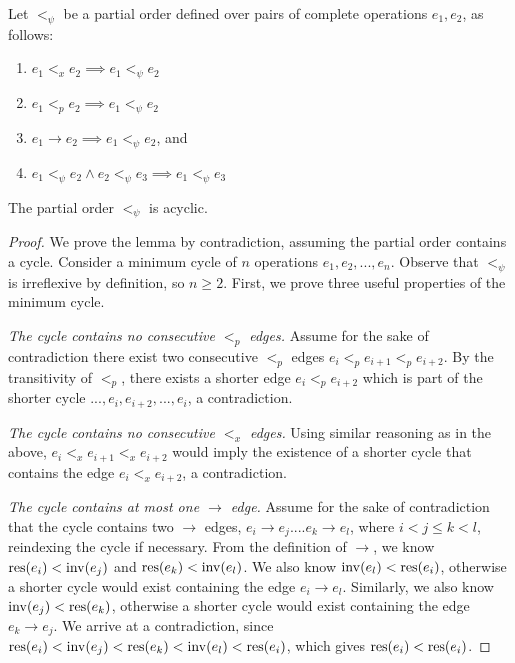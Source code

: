 Let $<_\psi$ be a partial order defined over pairs of complete operations $e_1, e_2$, as follows:
\begin{enumerate}
    \item $e_1 <_x e_2 \implies e_1 <_\psi e_2$
    \item $e_1 <_p e_2 \implies e_1 <_\psi e_2$
    \item $e_1 \rightarrow e_2 \implies e_1 <_\psi e_2$, and
    \item $e_1 <_\psi e_2 \land e_2 <_\psi e_3 \implies e_1 <_\psi e_3$
\end{enumerate}

\begin{lem}
\label{lemmamain}
The partial order $<_\psi$ is acyclic.
\end{lem}
\begin{proof}
We prove the lemma by contradiction, assuming the partial order contains a cycle. Consider a minimum cycle of $n$ operations $e_1,e_2,...,e_n$. Observe that $<_\psi$ is irreflexive by definition, so $n \geq 2$. First, we prove three useful properties of the minimum cycle.

 \textit{The cycle contains no consecutive $<_p$ edges.} {Assume for the sake of contradiction there exist two consecutive $<_p$ edges $e_i <_p e_{i+1} <_p e_{i+2}$. By the transitivity of $<_p$, there exists a shorter edge $e_i <_p e_{i+2}$ which is part of the shorter cycle $..., e_i, e_{i+2}, ..., e_i$, a contradiction.}

 \textit{The cycle contains no consecutive $<_x$ edges.} {Using similar reasoning as in the above, $e_i <_x e_{i+1} <_x e_{i+2}$ would imply the existence of a shorter cycle that contains the edge $e_i <_x e_{i+2}$, a contradiction.}

 \textit{The cycle contains at most one $\rightarrow$ edge.} Assume for the sake of contradiction that the cycle contains two $\rightarrow$ edges, $e_i \rightarrow e_j .... e_k \rightarrow e_l$, where $i < j \leq k < l$, reindexing the cycle if necessary. From the definition of $\rightarrow$, we know $\operatorname{\operatorname{res}}(e_i) < \operatorname{inv}(e_j)$ and $\operatorname{\operatorname{res}}(e_k) < \operatorname{inv}(e_l)$. We also know $\operatorname{inv}(e_l) < \operatorname{\operatorname{res}}(e_i)$, otherwise a shorter cycle would exist containing the edge $e_i \rightarrow e_l$. Similarly, we also know $\operatorname{inv}(e_j) < \operatorname{\operatorname{res}}(e_k)$, otherwise a shorter cycle would exist containing the edge $e_k \rightarrow e_j$. We arrive at a contradiction, since $\operatorname{\operatorname{res}}(e_i) < \operatorname{inv}(e_j) < \operatorname{\operatorname{res}}(e_k) < \operatorname{inv}(e_l) < \operatorname{\operatorname{res}}(e_i)$, which gives $\operatorname{\operatorname{res}}(e_i) < \operatorname{\operatorname{res}}(e_i)$.


\end{proof}
